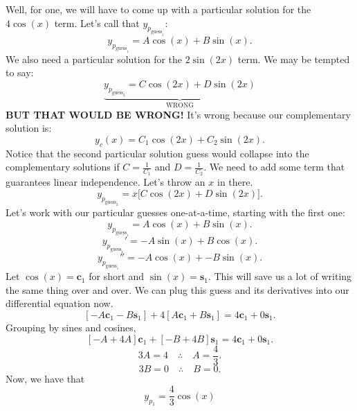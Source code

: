 \documentclass[a4paper,12pt]{article} %
\begin{document}
Well, for one, we will have to come up with a particular solution for the $4\cos{(x)}$ term. Let's call that $y_{p_{\text{guess}_1}}$:
$$ y_{p_{\text{guess}_1}} = A\cos{(x)} + B\sin{(x)}.$$
We also need a particular solution for the $2\sin{(2x)}$ term. We may be tempted to say:
$$ \underbrace{y_{p_{\text{guess}_2}} = C\cos{(2x)} + D\sin{(2x)}}_{\text{WRONG}} $$
\textbf{BUT THAT WOULD BE WRONG!} It's wrong because our complementary solution is:
$$ y_{c}(x) = C_1\cos{(2x)} + C_{2}\sin{(2x)}. $$
Notice that the second particular solution guess would collapse into the complementary solutions if $C = \frac{1}{C_1}$ and $D=\frac{1}{C_2}$. We need to add some term that guarantees linear independence. Let's throw an $x$ in there.
$$ y_{p_{\text{guess}_2}} = x\bigg[C\cos{(2x)} + D\sin{(2x)}\bigg]. $$
Let's work with our particular guesses one-at-a-time, starting with the first one:
$$ y_{p_{\text{guess}_1}} = A\cos{(x)} + B\sin{(x)}. $$
$$ y_{p_{\text{guess}_1}}' = -A\sin{(x)} + B\cos{(x)}. $$
$$ y_{p_{\text{guess}_1}}'' = -A\cos{(x)} + -B\sin{(x)}. $$
Let $\cos{(x)} = \textbf{c}_1$ for short and $\sin{(x)} = \textbf{s}_1$. This will save us a lot of writing the same thing over and over. We can plug this guess and its derivatives into our differential equation now.
$$ [-A\textbf{c}_1 - B\textbf{s}_1] + 4[A\textbf{c}_1 + B\textbf{s}_1] = 4\textbf{c}_1 + 0\textbf{s}_1. $$
Grouping by sines and cosines,
$$ [-A + 4A]\textbf{c}_1 + [-B + 4B]\textbf{s}_1 = 4\textbf{c}_1 + 0\textbf{s}_1. $$
$$ 3A = 4 \quad\therefore\quad A = \frac{4}{3}. $$
$$ 3B = 0 \quad\therefore\quad B = 0. $$
Now, we have that
$$ \boxed{y_{p_1} = \frac{4}{3}\cos{(x)}} $$
\pagebreak
\end{document}
